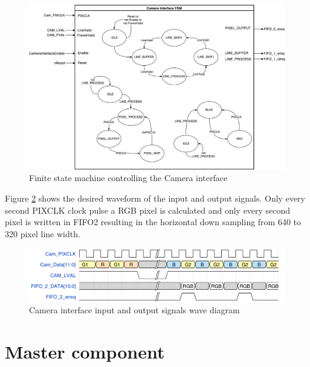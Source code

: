 \documentclass{article}
\begin{document}
\begin{figure}[H]
\centering
\hspace*{-0.1\textwidth}
\includegraphics[width=1.2\textwidth]{img/CameraInterfaceFSM.pdf}
\caption{Finite state machine controlling the Camera interface}
\label{fig:camera_interface_fsm}
\end{figure}

Figure \ref{fig:camera_interface_signals} shows the desired waveform of the input and output signals. Only every second PIXCLK clock pulse a RGB pixel is calculated and only every second pixel is written in FIFO2 resulting in the horizontal down sampling from 640 to 320 pixel line width.

\begin{figure}[H]
\centering
\includegraphics[width=\textwidth]{img/CameraInterfaceWaveDiagram.png}
\caption{Camera interface input and output signals wave diagram}
\label{fig:camera_interface_signals}
\end{figure}


\section{Master component}
\end{document}
